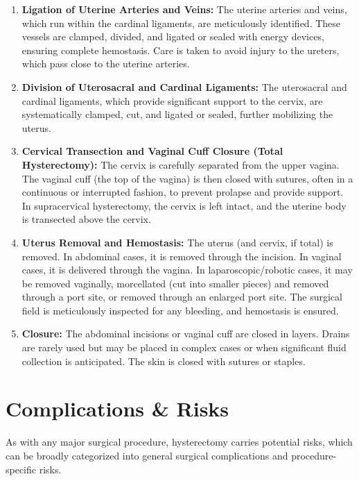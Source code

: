 \begin{enumerate}
  \item \textbf{Ligation of Uterine Arteries and Veins:} The uterine arteries and veins, which run within the cardinal ligaments, are meticulously identified. These vessels are clamped, divided, and ligated or sealed with energy devices, ensuring complete hemostasis. Care is taken to avoid injury to the ureters, which pass close to the uterine arteries.

  \item \textbf{Division of Uterosacral and Cardinal Ligaments:} The uterosacral and cardinal ligaments, which provide significant support to the cervix, are systematically clamped, cut, and ligated or sealed, further mobilizing the uterus.

  \item \textbf{Cervical Transection and Vaginal Cuff Closure (Total Hysterectomy):} The cervix is carefully separated from the upper vagina. The vaginal cuff (the top of the vagina) is then closed with sutures, often in a continuous or interrupted fashion, to prevent prolapse and provide support. In supracervical hysterectomy, the cervix is left intact, and the uterine body is transected above the cervix.

  \item \textbf{Uterus Removal and Hemostasis:} The uterus (and cervix, if total) is removed. In abdominal cases, it is removed through the incision. In vaginal cases, it is delivered through the vagina. In laparoscopic/robotic cases, it may be removed vaginally, morcellated (cut into smaller pieces) and removed through a port site, or removed through an enlarged port site. The surgical field is meticulously inspected for any bleeding, and hemostasis is ensured.

  \item \textbf{Closure:} The abdominal incisions or vaginal cuff are closed in layers. Drains are rarely used but may be placed in complex cases or when significant fluid collection is anticipated. The skin is closed with sutures or staples.
\end{enumerate}

\section*{Complications \& Risks}
As with any major surgical procedure, hysterectomy carries potential risks, which can be broadly categorized into general surgical complications and procedure-specific risks.

